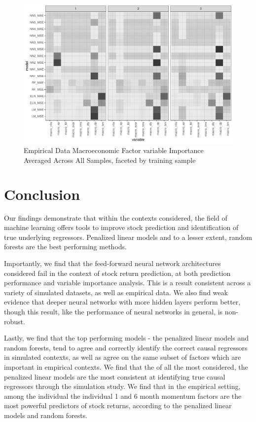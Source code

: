 \documentclass[11pt, a4paper, table]{article}
\begin{document}
\begin{landscape}
\begin{figure}
	\includegraphics{empirical_sample_all_vi_macro_facet.pdf}
	\caption{Empirical Data Macroeconomic Factor variable Importance Averaged Across All Samples, faceted by training sample}
	\label{empirical_macro_facet}
\end{figure}
\end{landscape}

\section{Conclusion}

Our findings demonstrate that within the contexts considered, the field of machine learning offers tools to improve stock prediction and identification of true underlying regressors. Penalized linear models and to a lesser extent, random forests are the best performing methods.

Importantly, we find that the feed-forward neural network architectures considered fail in the context of stock return prediction, at both prediction performance and variable importance analysis. This is a result consistent across a variety of simulated datasets, as well as empirical data. We also find weak evidence that deeper neural networks with more hidden layers perform better, though this result, like the performance of neural networks in general, is non-robust.

Lastly, we find that the top performing models - the penalized linear models and random forests, tend to agree and correctly identify the correct causal regressors in simulated contexts, as well as agree on the same subset of factors which are important in empirical contexts. We find that the of all the most considered, the penalized linear models are the most consistent at identifying true causal regressors through the simulation study. We find that in the empirical setting, among the individual the individual 1 and 6 month momentum factors are the most powerful predictors of stock returns, according to the penalized linear models and random forests. 
\end{document}
